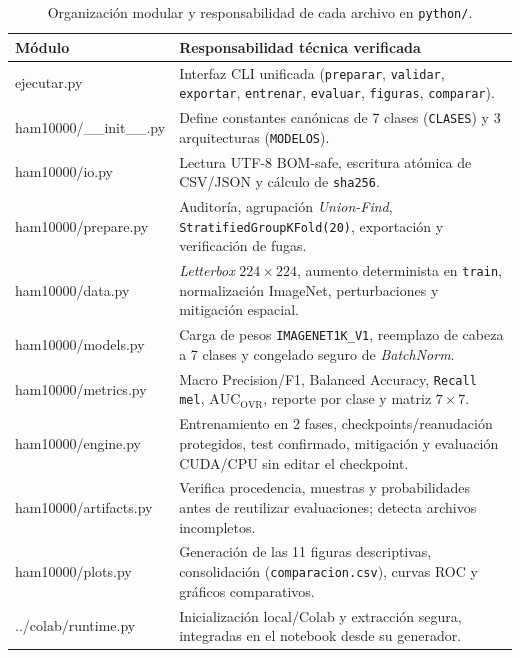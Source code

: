 \begin{table}[htbp]\centering\small
\caption{Organización modular y responsabilidad de cada archivo en \texttt{python/}.}
\label{tab:modulos}
\begin{tabularx}{\textwidth}{@{}>{\ttfamily}p{4.3cm}>{\raggedright\arraybackslash}X@{}}
\toprule
\textbf{\textrm{Módulo}} & \textbf{Responsabilidad técnica verificada} \\ \midrule
ejecutar.py & Interfaz CLI unificada (\texttt{preparar}, \texttt{validar}, \texttt{exportar}, \texttt{entrenar}, \texttt{evaluar}, \texttt{figuras}, \texttt{comparar}). \\
ham10000/\_\_init\_\_.py & Define constantes canónicas de 7 clases (\texttt{CLASES}) y 3 arquitecturas (\texttt{MODELOS}). \\
ham10000/io.py & Lectura UTF-8 BOM-safe, escritura atómica de CSV/JSON y cálculo de \texttt{sha256}. \\
ham10000/prepare.py & Auditoría, agrupación \textit{Union-Find}, \texttt{StratifiedGroupKFold(20)}, exportación y verificación de fugas. \\
ham10000/data.py & \textit{Letterbox} $224\times224$, aumento determinista en \texttt{train}, normalización ImageNet, perturbaciones y mitigación espacial. \\
ham10000/models.py & Carga de pesos \texttt{IMAGENET1K\_V1}, reemplazo de cabeza a 7 clases y congelado seguro de \textit{BatchNorm}. \\
ham10000/metrics.py & Macro Precision/F1, Balanced Accuracy, \texttt{Recall mel}, $\mathrm{AUC}_{\mathrm{OVR}}$, reporte por clase y matriz $7\times7$. \\
ham10000/engine.py & Entrenamiento en 2 fases, checkpoints/reanudación protegidos, test confirmado, mitigación y evaluación CUDA/CPU sin editar el checkpoint. \\
ham10000/artifacts.py & Verifica procedencia, muestras y probabilidades antes de reutilizar evaluaciones; detecta archivos incompletos. \\
ham10000/plots.py & Generación de las 11 figuras descriptivas, consolidación (\texttt{comparacion.csv}), curvas ROC y gráficos comparativos. \\
../colab/runtime.py & Inicialización local/Colab y extracción segura, integradas en el notebook desde su generador. \\
\bottomrule
\end{tabularx}
\end{table}

\FloatBarrier
